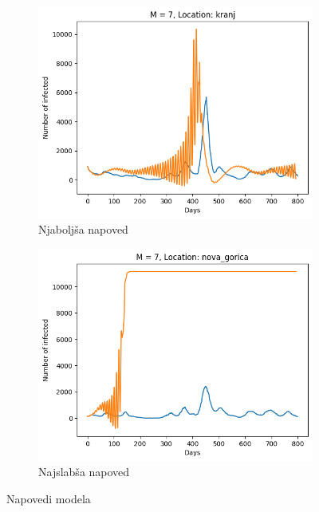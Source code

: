\documentclass[12pt]{article}
\begin{document}
\begin{figure}[htbp]
   
  \centering
  \begin{subfigure}[b]{0.49\textwidth}
    \centering
    \includegraphics[width=\textwidth]{Fig/bestM7.png}
    \caption{Njaboljša napoved}
    \label{subfig:1}
  \end{subfigure}
  \hfill
  \begin{subfigure}[b]{0.49\textwidth}
    \centering
    \includegraphics[width=\textwidth]{Fig/worseM7.png}
    \caption{Najslabša napoved}
    \label{subfig:2}
  \end{subfigure}
  \caption{Napovedi modela}
  \label{slika1}

\end{figure}
\end{document}
